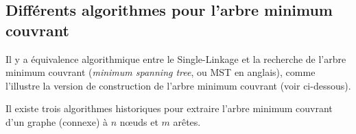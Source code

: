 \subsection{Différents algorithmes pour l'arbre minimum couvrant}





Il y a équivalence algorithmique entre le Single-Linkage et la recherche de l'arbre minimum couvrant (\emph{minimum spanning tree}, ou MST en anglais), comme l'illustre la version  de construction de l'arbre minimum couvrant (voir ci-dessous). %


Il existe trois algorithmes historiques pour extraire l'arbre minimum couvrant d'un graphe (connexe) à $n$ nœuds et $m$ arêtes.

